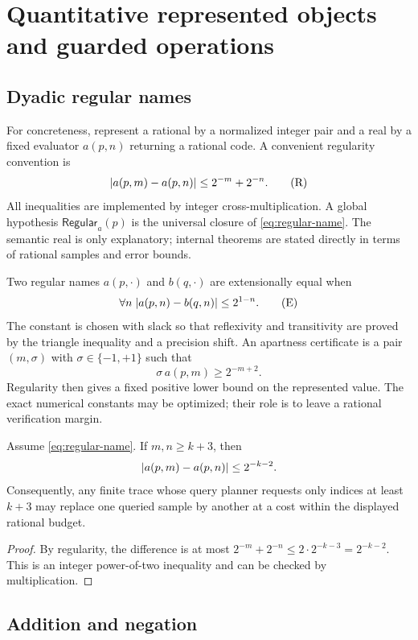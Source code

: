 \section{Quantitative represented objects and guarded operations}
\label{sec:quantitative}

\subsection{Dyadic regular names}

For concreteness, represent a rational by a normalized integer pair and a real by a fixed evaluator $a(p,n)$ returning a rational code.  A convenient regularity convention is
\[
  \lvert a(p,m)-a(p,n)\rvert\le 2^{-m}+2^{-n}.
  \tag{R}\label{eq:regular-name}
\]
All inequalities are implemented by integer cross-multiplication.  A global hypothesis $\mathsf{Regular}_a(p)$ is the universal closure of \eqref{eq:regular-name}.  The semantic real is only explanatory; internal theorems are stated directly in terms of rational samples and error bounds.

Two regular names $a(p,\cdot)$ and $b(q,\cdot)$ are extensionally equal when
\[
  \forall n\;\lvert a(p,n)-b(q,n)\rvert\le 2^{1-n}.
  \tag{E}\label{eq:name-eq}
\]
The constant is chosen with slack so that reflexivity and transitivity are proved by the triangle inequality and a precision shift.  An apartness certificate is a pair $(m,\sigma)$ with $\sigma\in\{-1,+1\}$ such that
\[
  \sigma\,a(p,m)\ge 2^{-m+2}.
  \tag{A}\label{eq:apartness}
\]
Regularity then gives a fixed positive lower bound on the represented value.  The exact numerical constants may be optimized; their role is to leave a rational verification margin.

\begin{lemma}
\label{lem:sample-stability}
Assume \eqref{eq:regular-name}.  If $m,n\ge k+3$, then
\[
 \lvert a(p,m)-a(p,n)\rvert\le 2^{-k-2}.
\]
Consequently, any finite trace whose query planner requests only indices at least $k+3$ may replace one queried sample by another at a cost within the displayed rational budget.
\end{lemma}

\begin{proof}
By regularity, the difference is at most $2^{-m}+2^{-n}\le2\cdot2^{-k-3}=2^{-k-2}$.  This is an integer power-of-two inequality and can be checked by multiplication.
\end{proof}

\subsection{Addition and negation}

